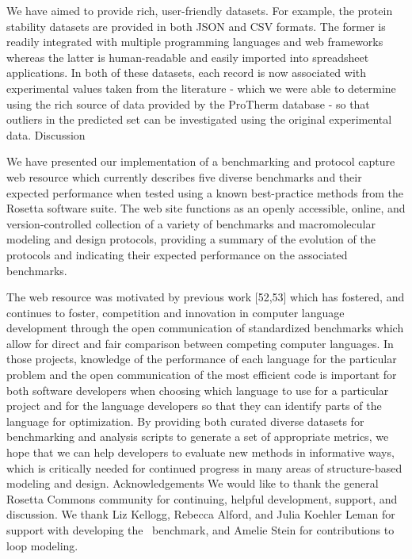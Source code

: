 We have aimed to provide rich, user-friendly datasets. For example, the protein stability datasets are provided in both JSON and CSV formats. The former is readily integrated with multiple programming languages and web frameworks whereas the latter is human-readable and easily imported into spreadsheet applications. In both of these datasets, each record is now associated with experimental values taken from the literature - which we were able to determine using the rich source of data provided by the ProTherm database \cite{kumar_protherm_2006} - so that outliers in the predicted set can be investigated using the original experimental data.
Discussion

We have presented our implementation of a benchmarking and protocol capture web resource which currently describes five diverse benchmarks and their expected performance when tested using a known best-practice methods from the Rosetta software suite. The web site functions as an openly accessible, online, and version-controlled collection of a variety of benchmarks and macromolecular modeling and design protocols, providing a summary of the evolution of the protocols and indicating their expected performance on the associated benchmarks.

The web resource was motivated by previous work [52,53] which has fostered, and continues to foster, competition and innovation in computer language development through the open communication of standardized benchmarks which allow for direct and fair comparison between competing computer languages. In those projects, knowledge of the performance of each language for the particular problem and the open communication of the most efficient code is important for both software developers when choosing which language to use for a particular project and for the language developers so that they can identify parts of the language for optimization. By providing both curated diverse datasets for benchmarking and analysis scripts to generate a set of appropriate metrics, we hope that we can help developers to evaluate new methods in informative ways, which is critically needed for continued progress in many areas of structure-based modeling and design.
Acknowledgements
We would like to thank the general Rosetta Commons community for continuing, helpful development, support, and discussion. We thank Liz Kellogg, Rebecca Alford, and Julia Koehler Leman for support with developing the \ddg\ benchmark, and Amelie Stein for contributions to loop modeling.